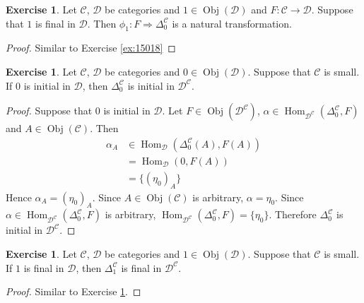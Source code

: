 \documentclass[12pt]{amsart}
\theoremstyle{definition}
\newtheorem{ex}[definition]{Exercise}
\newcommand{\al}{\alpha}
\newcommand{\Del}{\Delta}
\newcommand{\MC}{\mathcal{C}}
\newcommand{\MD}{\mathcal{D}}
\DeclareMathOperator{\Obj}{Obj}
\DeclareMathOperator{\Hom}{Hom}
\DeclareMathOperator*{\0}{\mbf{0}}
\DeclareMathOperator*{\1}{\mbf{1}}
\newcommand{\lex}[1]{\label{ex:#1}}
\newcommand{\rex}[1]{Exercise \ref{ex:#1}}
\begin{document}
	\begin{ex} \lex{15019}
		Let $\MC$, $\MD$ be categories and $1 \in \Obj(\MD)$ and $F: \MC \rightarrow \MD$. Suppose that $1$ is final in $\MD$. Then $\phi_{1}: F \Rightarrow \Del^{\MC}_0$ is a natural transformation.
	\end{ex}

	\begin{proof}
		Similar to \rex{15018}
	\end{proof}
	
	\begin{ex} \lex{15020}
		Let $\MC$, $\MD$ be categories and $0 \in \Obj(\MD)$. Suppose that $\MC$ is small. If $0$ is initial in $\MD$, then $\Del^{\MC}_0$ is initial in $\MD^{\MC}$. 
	\end{ex}

	\begin{proof}
		Suppose that $0$ is initial in $\MD$. Let $F \in \Obj(\MD^{\MC})$, $\al \in \Hom_{\MD^{\MC}}(\Del^{\MC}_0, F)$ and $A \in \Obj(\MC)$. Then
		\begin{align*}
			\al_A 
			& \in \Hom_{\MD}(\Del^{\MC}_0(A), F(A)) \\
			& =  \Hom_{\MD}(0, F(A)) \\
			& = \{(\eta_0)_A\}
		\end{align*}
		Hence $\al_A = (\eta_0)_A$. Since $A \in \Obj(\MC)$ is arbitrary, $\al = \eta_0$. Since $\al \in  \Hom_{\MD^{\MC}}(\Del^{\MC}_0, F)$ is arbitrary, $ \Hom_{\MD^{\MC}}(\Del^{\MC}_0, F) = \{\eta_0\}$. Therefore $\Del^{\MC}_0$ is initial in $\MD^{\MC}$.
	\end{proof}


	\begin{ex} \lex{15021}
		Let $\MC$, $\MD$ be categories and $1 \in \Obj(\MD)$. Suppose that $\MC$ is small. If $1$ is final in $\MD$, then $\Del^{\MC}_1$ is final in $\MD^{\MC}$. 
	\end{ex}

	\begin{proof}
		Similar to \rex{15020}.
	\end{proof}
	
\end{document}
